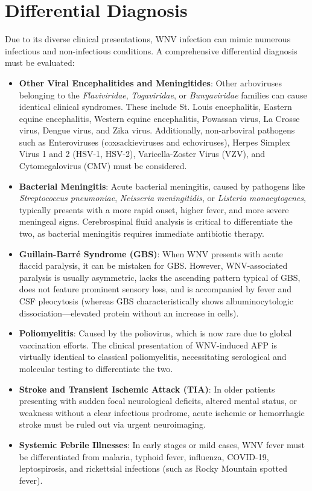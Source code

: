 \section*{Differential Diagnosis}
Due to its diverse clinical presentations, WNV infection can mimic numerous infectious and non-infectious conditions. A comprehensive differential diagnosis must be evaluated:
\begin{itemize}
    \item \textbf{Other Viral Encephalitides and Meningitides}: Other arboviruses belonging to the \textit{Flaviviridae}, \textit{Togaviridae}, or \textit{Bunyaviridae} families can cause identical clinical syndromes. These include St. Louis encephalitis, Eastern equine encephalitis, Western equine encephalitis, Powassan virus, La Crosse virus, Dengue virus, and Zika virus. Additionally, non-arboviral pathogens such as Enteroviruses (coxsackieviruses and echoviruses), Herpes Simplex Virus 1 and 2 (HSV-1, HSV-2), Varicella-Zoster Virus (VZV), and Cytomegalovirus (CMV) must be considered.
    \item \textbf{Bacterial Meningitis}: Acute bacterial meningitis, caused by pathogens like \textit{Streptococcus pneumoniae}, \textit{Neisseria meningitidis}, or \textit{Listeria monocytogenes}, typically presents with a more rapid onset, higher fever, and more severe meningeal signs. Cerebrospinal fluid analysis is critical to differentiate the two, as bacterial meningitis requires immediate antibiotic therapy.
    \item \textbf{Guillain-Barré Syndrome (GBS)}: When WNV presents with acute flaccid paralysis, it can be mistaken for GBS. However, WNV-associated paralysis is usually asymmetric, lacks the ascending pattern typical of GBS, does not feature prominent sensory loss, and is accompanied by fever and CSF pleocytosis (whereas GBS characteristically shows albuminocytologic dissociation—elevated protein without an increase in cells).
    \item \textbf{Poliomyelitis}: Caused by the poliovirus, which is now rare due to global vaccination efforts. The clinical presentation of WNV-induced AFP is virtually identical to classical poliomyelitis, necessitating serological and molecular testing to differentiate the two.
    \item \textbf{Stroke and Transient Ischemic Attack (TIA)}: In older patients presenting with sudden focal neurological deficits, altered mental status, or weakness without a clear infectious prodrome, acute ischemic or hemorrhagic stroke must be ruled out via urgent neuroimaging.
    \item \textbf{Systemic Febrile Illnesses}: In early stages or mild cases, WNV fever must be differentiated from malaria, typhoid fever, influenza, COVID-19, leptospirosis, and rickettsial infections (such as Rocky Mountain spotted fever).
\end{itemize}

